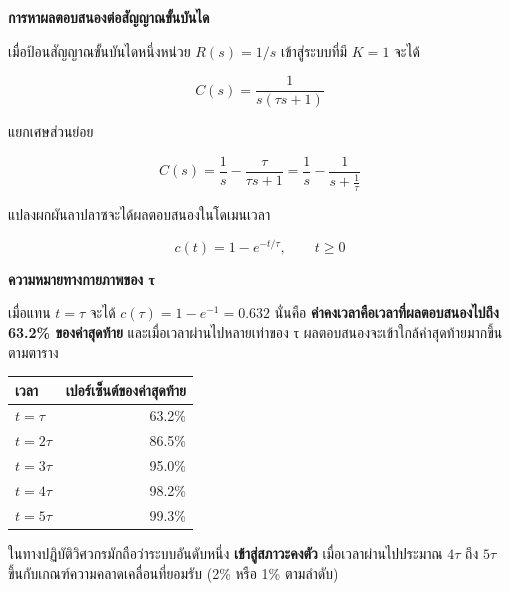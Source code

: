 \textbf{การหาผลตอบสนองต่อสัญญาณขั้นบันได}

เมื่อป้อนสัญญาณขั้นบันไดหนึ่งหน่วย $R(s) = 1/s$ เข้าสู่ระบบที่มี $K=1$ จะได้

\[
C(s) = \frac{1}{s(\tau s+1)}
\]

แยกเศษส่วนย่อย

\[
C(s) = \frac{1}{s} - \frac{\tau}{\tau s+1} = \frac{1}{s} - \frac{1}{s+\frac{1}{\tau}}
\]

แปลงผกผันลาปลาซจะได้ผลตอบสนองในโดเมนเวลา

\[
c(t) = 1 - e^{-t/\tau}, \qquad t \ge 0
\]

\textbf{ความหมายทางกายภาพของ τ}

เมื่อแทน $t=\tau$ จะได้ $c(\tau) = 1-e^{-1} = 0.632$ นั่นคือ \textbf{ค่าคงเวลาคือเวลาที่ผลตอบสนองไปถึง 63.2\% ของค่าสุดท้าย} และเมื่อเวลาผ่านไปหลายเท่าของ τ ผลตอบสนองจะเข้าใกล้ค่าสุดท้ายมากขึ้นตามตาราง

\begin{table}[htbp]
    \centering
    \begin{tabular}{lr}
        \hline
        \textbf{เวลา} & \textbf{เปอร์เซ็นต์ของค่าสุดท้าย} \\
        \hline
        $t = \tau$ & 63.2\% \\
        $t = 2\tau$ & 86.5\% \\
        $t = 3\tau$ & 95.0\% \\
        $t = 4\tau$ & 98.2\% \\
        $t = 5\tau$ & 99.3\% \\
        \hline
    \end{tabular}
\end{table}

ในทางปฏิบัติวิศวกรมักถือว่าระบบอันดับหนึ่ง \textbf{เข้าสู่สภาวะคงตัว} เมื่อเวลาผ่านไปประมาณ $4\tau$ ถึง $5\tau$ ขึ้นกับเกณฑ์ความคลาดเคลื่อนที่ยอมรับ (2\% หรือ 1\% ตามลำดับ)


